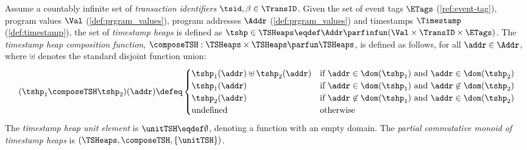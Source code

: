 \begin{defn}
\label{def:timestamp_heaps}
Assume a countably infinite set of \emph{transaction identifiers} $\tsid, \beta \in \TransID$.
Given the set of event tags $\ETags$ (\ref{ref:event-tag}), program values $\Val$ (\ref{def:prgram_values}), program addresses $\Addr$ (\ref{def:prgram_values}) and timestamps \(\Timestamp\) (\ref{def:timestamp}), the set of \emph{timestamp heaps} is defined as $\tshp \in \TSHeaps \eqdef \Addr \parfinfun (\Val \times \TransID \times \ETags)$.
The \emph{timestamp heap composition function}, $\composeTSH: \TSHeaps \times \TSHeaps \parfun \TSHeaps$, is defined as follows, for all $\addr \in \Addr$, where $\uplus$ denotes the standard disjoint function union:
%
\[
	(\tshp_1 \composeTSH \tshp_2)(\addr) \defeq 
	\begin{cases}
		\tshp_1(\addr) \uplus \tshp_2(\addr) & \text{if } \addr \in \dom(\tshp_1) \text{ and } \addr \in \dom(\tshp_2) \\
		\tshp_1(\addr) & \text{if } \addr \in \dom(\tshp_1) \text{ and } \addr \not\in \dom(\tshp_2) \\
		\tshp_2(\addr) & \text{if } \addr \not\in \dom(\tshp_1) \text{ and } \addr \in \dom(\tshp_2) \\
		\text{undefined} & \text{otherwise}
	\end{cases}
\]
%
The \emph{timestamp heap unit element} is $\unitTSH \eqdef \emptyset$, denoting a function with an empty domain.
The \emph{partial commutative monoid of timestamp heaps} is $(\TSHeaps, \composeTSH, \{\unitTSH\})$. 
\end{defn}
 
